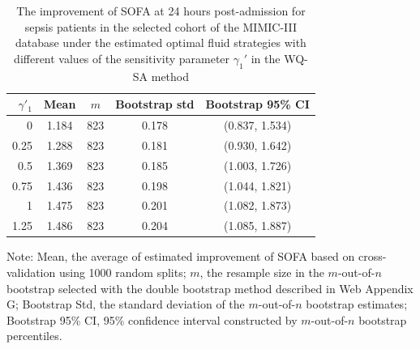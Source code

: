 \documentclass[12pt]{article}
\begin{document}
\begin{table}[htbp]
\centering
  \caption{The improvement of SOFA at 24 hours post-admission for sepsis patients in the selected cohort of  the MIMIC-III database under the estimated optimal fluid strategies  with different values of the  sensitivity parameter  $\gamma_1'$ in the WQ-SA method}
  \centering
  \begin{threeparttable}
  \label{RDA_sen}
    \centering
    \begin{tabular}{rcccc}
    \hline
    $\gamma'_1$ & Mean & $m$ &  Bootstrap std & Bootstrap 95\% CI \\
    \hline
    0 & 1.184  & 823 & 0.178 & (0.837, 1.534) \\
    0.25 & 1.288  & 823 &  0.181 & (0.930, 1.642) \\
    0.5 & 1.369  & 823 & 0.185 & (1.003, 1.726) \\
    0.75 & 1.436  & 823 & 0.198 & (1.044, 1.821) \\
    1 & 1.475  & 823 & 0.201 & (1.082, 1.873) \\
    1.25 & 1.486  & 823 & 0.204 & (1.085, 1.887) \\
    \hline 
    \end{tabular} 
    \begin{tablenotes}
    \small
    \item Note: 
    Mean, the average of estimated improvement  of SOFA based on cross-validation using 1000 random splits;
    $m$, the  resample size in the $m$-out-of-$n$ bootstrap selected with the double bootstrap method described in Web Appendix G;
    Bootstrap Std, the  standard deviation of the $m$-out-of-$n$ bootstrap estimates;
    Bootstrap 95\% CI, 95\% confidence interval constructed by $m$-out-of-$n$ bootstrap percentiles.
    \end{tablenotes}
\end{threeparttable}   
\end{table}%
\end{document}
